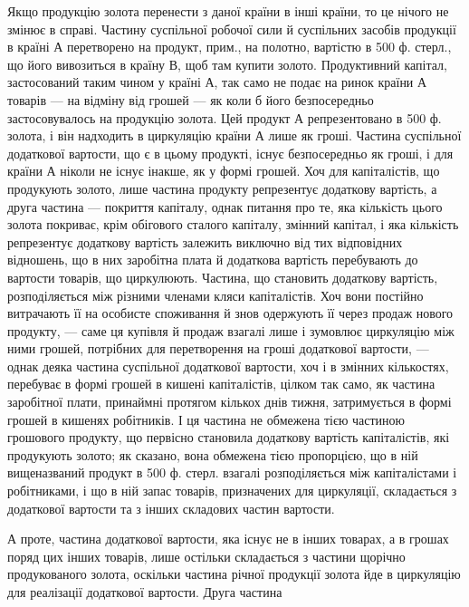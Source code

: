 Якщо продукцію золота перенести з даної країни в інші країни, то
це нічого не змінює в справі. Частину суспільної робочої сили й суспільних
засобів продукції в країні А перетворено на продукт, прим., на
полотно, вартістю в 500 ф. стерл., що його вивозиться в країну В, щоб
там купити золото. Продуктивний капітал, застосований таким чином у
країні А, так само не подає на ринок країни А товарів — на відміну
від грошей — як коли б його безпосередньо застосовувалось на продукцію
золота. Цей продукт А репрезентовано в 500 ф. золота, і він
надходить в циркуляцію країни А лише як гроші. Частина суспільної
додаткової вартости, що є в цьому продукті, існує безпосередньо як
гроші, і для країни А ніколи не існує інакше, як у формі грошей. Хоч
для капіталістів, що продукують золото, лише частина продукту репрезентує
додаткову вартість, а друга частина — покриття капіталу, однак питання
про те, яка кількість цього золота покриває, крім обігового сталого
капіталу, змінний капітал, і яка кількість репрезентує додаткову
вартість залежить виключно від тих відповідних відношень,
що в них заробітна плата й додаткова вартість перебувають до
вартости товарів, що циркулюють. Частина, що становить додаткову
вартість, розподіляється між різними членами кляси капіталістів. Хоч
вони постійно витрачають її на особисте споживання й знов одержують
її через продаж нового продукту, — саме ця купівля й продаж взагалі
лише і зумовлює циркуляцію між ними грошей, потрібних для перетворення
на гроші додаткової вартости, — однак деяка частина суспільної
додаткової вартости, хоч і в змінних кількостях, перебуває в формі
грошей в кишені капіталістів, цілком так само, як частина заробітної
плати, принаймні протягом кількох днів тижня, затримується в формі грошей
в кишенях робітників. І ця частина не обмежена тією частиною грошового
продукту, що первісно становила додаткову вартість капіталістів, які
продукують золото; як сказано, вона обмежена тією пропорцією, що в
ній вищеназваний продукт в 500 ф. стерл. взагалі розподіляється між
капіталістами і робітниками, і що в ній запас товарів, призначених для
циркуляції, складається з додаткової вартости та з інших складових частин
вартости.

А проте, частина додаткової вартости, яка існує не в інших товарах,
а в грошах поряд цих інших товарів, лише остільки складається з частини
щорічно продукованого золота, оскільки частина річної продукції золота
йде в циркуляцію для реалізації додаткової вартости. Друга частина
\parbreak{}  %
